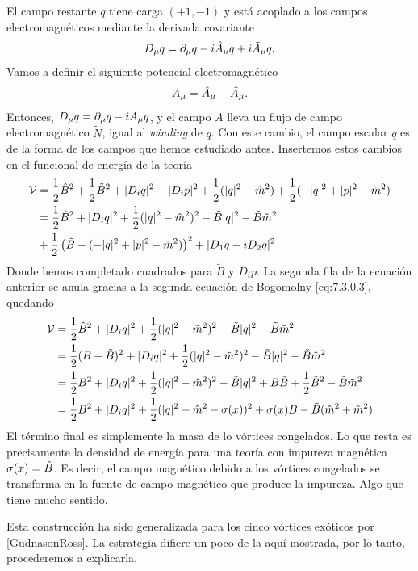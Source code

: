 El campo restante $q$ tiene carga $(+1,-1)$ y está acoplado a los campos electromagnéticos mediante la derivada covariante
\begin{align}
	D_\mu q = \partial_\mu q-i\hat A_\mu q+i\tilde A_\mu q.
\end{align}
Vamos a definir el siguiente potencial electromagnético
\begin{align}
	A_\mu = \hat A_\mu-\tilde A_\mu. \label{eq:7.3.0.7}
\end{align}
Entonces, $D_\mu q = \partial_\mu q-i A_\mu q$, y el campo $A$ lleva un flujo de campo electromagnético $\tilde N$, igual al \emph{winding} de $q$. Con este cambio, el campo escalar $q$ es de la forma de los campos que hemos estudiado antes. Insertemos estos cambios en el funcional de energía de la teoría
\begin{align}
	\mathcal{V} & =  \frac{1}{2}\hat B^2 +\frac{1}{2}\tilde B^2+|D_iq|^2+|D_ip|^2+\frac{1}{2}(|q|^2-\hat m^2)+\frac{1}{2}(-|q|^2+|p|^2-\tilde m^2)\nonumber \\
	      & = \frac{1}{2}\hat B^2+|D_iq|^2+\frac{1}{2}(|q|^2-\hat m^2)^2-\tilde B|q|^2-\tilde B\tilde m^2\nonumber                        \\
	      & +\frac{1}{2}\left(\tilde B-(-|q|^2+|p|^2-\tilde m^2)\right)^2+|D_1q-iD_2q|^2
\end{align}
Donde hemos completado cuadrados para $\tilde B$ y $D_i p$. La segunda fila de la ecuación anterior se anula gracias a la segunda ecuación de Bogomolny \eqref{eq:7.3.0.3}, quedando
\begin{align}
	\mathcal{V} & = \frac{1}{2}\hat B^2+|D_iq|^2+\frac{1}{2}(|q|^2-\tilde m^2)^2-\tilde B|q|^2-\tilde B\tilde m^2                     \\
	      & = \frac{1}{2}(B+\tilde B)^2+|D_iq|^2+\frac{1}{2}(|q|^2-\tilde m^2)^2-\tilde B|q|^2-\tilde B\tilde m^2             \\
	      & = \frac{1}{2} B^2+|D_iq|^2+\frac{1}{2}(|q|^2-\hat m^2)^2-\tilde B|q|^2+B\tilde B+\frac{1}{2}\tilde B^2-\tilde B\tilde m^2 \\
	      & = \frac{1}{2}B^2+|D_iq|^2+\frac{1}{2}(|q|^2-\hat m^2-\sigma(x))^2+\sigma(x)B-\tilde B(\hat m^2 +\tilde m^2)
\end{align}
El término final es simplemente la masa de lo vórtices congelados. Lo que resta es precisamente la densidad de energía para una teoría con impureza magnética $\sigma(x)=\tilde B$. Es decir, el campo magnético debido a los vórtices congelados se transforma en la fuente de campo magnético que produce la impureza. Algo que tiene mucho sentido.

Esta construcción ha sido generalizada para los cinco vórtices exóticos por [GudnasonRoss]. La estrategia difiere un poco de la aquí mostrada, por lo tanto, procederemos a explicarla.

